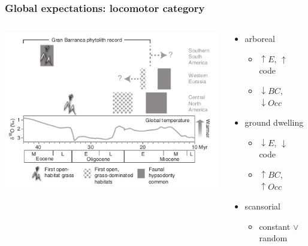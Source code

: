 \documentclass{beamer}
\begin{document}
\begin{frame}
  \frametitle{Global expectations: locomotor category}

  \begin{columns}
    \begin{column}{0.6\textwidth}
      \includegraphics[height=0.8\textheight,width=\textwidth,keepaspectratio=true]{figure/stromberg}

      \tiny{}
    \end{column}
    \begin{column}{0.4\textwidth}
      \begin{itemize}
        \item arboreal
          \begin{itemize}
            \item \(\uparrow E\), \(\uparrow\) code
            \item \(\downarrow BC\), \(\downarrow Occ\)
          \end{itemize}
        \item ground dwelling
          \begin{itemize}
            \item \(\downarrow E\), \(\downarrow\) code
            \item \(\uparrow BC\), \(\uparrow Occ\)
          \end{itemize}
        \item scansorial
          \begin{itemize}
            \item constant \(\lor\) random
          \end{itemize}
      \end{itemize}
    \end{column}
  \end{columns}
\end{frame}
\end{document}
